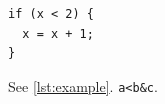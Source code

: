 \documentclass{article}
\begin{document}
\begin{lstlisting}[caption=Example,label=lst:example]
if (x < 2) {
  x = x + 1;
}
\end{lstlisting}
See \ref{lst:example}. \lstinline[breaklines=true]|a<b&c|.
\end{document}
